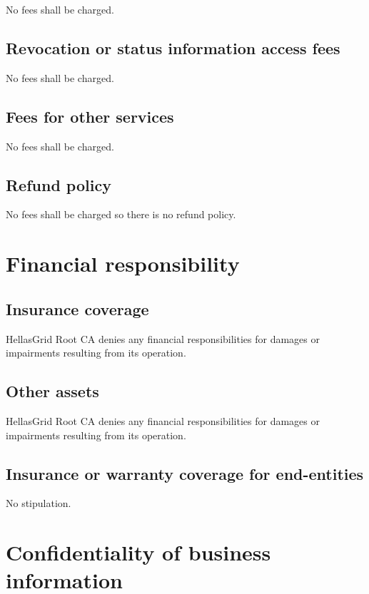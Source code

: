 \documentclass[11pt,a4paper,titlepage]{book}
\begin{document}
No fees shall be charged.

\subsection{Revocation or status information access fees}

No fees shall be charged.

\subsection{Fees for other services}

No fees shall be charged.

\subsection{Refund policy}

No fees shall be charged so there is no refund policy.

\section{Financial responsibility}




\subsection{Insurance coverage}

HellasGrid Root CA denies any financial responsibilities for damages or impairments resulting from its operation.

\subsection{Other assets}

HellasGrid Root CA denies any financial responsibilities for damages or impairments resulting from its operation.


\subsection{Insurance or warranty coverage for end-entities}

No stipulation.


\section{Confidentiality of business information}
\end{document}
